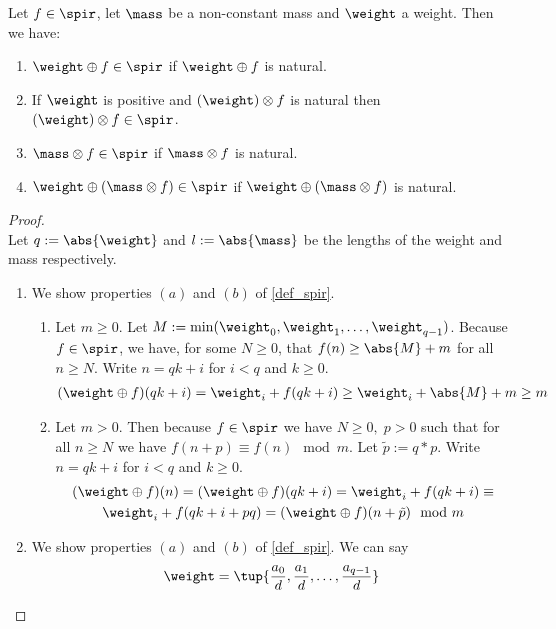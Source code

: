 \begin{proposition}\label{mass_spir}
	Let $f\in\spir$, let $\mass$ be a non-constant mass and $\weight$ a weight. Then we have:
	\begin{enumerate}
		\item $\weight \oplus f \in \spir$ if $\weight \oplus f$ is natural.
		\item If $\weight$ is positive and $(\weight)\otimes f$ is natural then $(\weight)\otimes f\in\spir$.
		\item $\mass\otimes f\in\spir$ if $\mass\otimes f$ is natural.
		\item $\weight\oplus(\mass\otimes f)\in\spir$ if $\weight\oplus(\mass\otimes f)$ is natural.
	\end{enumerate}
	\begin{proof}\hfill\\
		Let $q := \abs{\weight}$ and $l := \abs{\mass}$ be the lengths of the weight and mass respectively.
		\begin{enumerate}
			\item We show properties $(a)$ and $(b)$ of \cref{def_spir}.
			\begin{enumerate}
				\item 
				Let $m\geq 0$. Let $M := \min(\weight_0,\weight_1,\dots,\weight_{q-1})$. Because $f\in\spir$, we have, for some $N\geq0$, that $f(n) \geq \abs{M} + m$ for all $n \geq N$. Write $n = qk+i$ for $i<q$ and $k\geq0$.
				\begin{align*}
					(\weight \oplus f)(qk+i) = \weight_i + f(qk+i) \geq \weight_i + \abs{M} + m \geq m
				\end{align*}
				\item
				Let $m > 0$. Then because $f\in\spir$ we have $N\geq0,\;p>0$ such that for all $n\geq N$ we have $f(n+p)\equiv f(n) \mod m$. Let $\tilde{p} := q*p$. Write $n = qk+i$ for $i<q$ and $k\geq0$.
				\begin{gather*}
					(\weight \oplus f)(n) =
					(\weight \oplus f)(qk+i) = 
					\weight_i + f(qk+i) \equiv \\
					\weight_i + f(qk+i+pq) = 
					(\weight \oplus f)(n+\tilde{p}) \mod m
				\end{gather*}
			\end{enumerate}
			\item We show properties $(a)$ and $(b)$ of \cref{def_spir}. 
			We can say
			\begin{align*}
				\weight = \tup{\frac{a_0}{d},\frac{a_1}{d},\dots,\frac{a_{q-1}}{d}}
			\end{align*}

\end{enumerate}
\end{proof}
\end{proposition}
